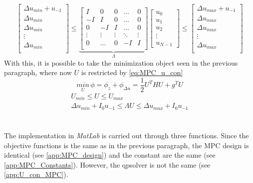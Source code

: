 \begin{equation}
    \begin{bmatrix}
        \Delta u_{min}+u_{-1}\\
        \Delta u_{min}\\
        \Delta u_{min}\\
        \vdots\\
        \Delta u_{min}\\
    \end{bmatrix} \leq
    \underbrace{
    \begin{bmatrix}
        I & 0 & 0 & \dots & 0\\
        -I & I & 0 & \dots & 0\\
        0 & -I & I & \dots & 0\\
        \vdots & \vdots & \vdots & \ddots & \vdots \\
        0 & \dots & 0 & -I & I\\
    \end{bmatrix}}_\Lambda
    \begin{bmatrix}
        u_0\\ u_1\\ u_2\\ \vdots\\ u_{N-1}
    \end{bmatrix}\leq
    \begin{bmatrix}
        \Delta u_{max}+u_{-1}\\
        \Delta u_{max}\\
        \Delta u_{max}\\
        \vdots\\
        \Delta u_{max}\\
    \end{bmatrix}
    \label{eq:In_con_Delta_u}
\end{equation}
With this, it is possible to take the minimization object seen in the previous paragraph, where now $U$ is restricted by \cref{eq:MPC_u_con}
\begin{equation}
    \underset{U}{min}\,\phi=\phi_z+\phi_{\Delta u}=\frac{1}{2}U^THU+g^TU
\end{equation}
\begin{equation}
    \label{eq:MPC_u_con}
    \begin{gathered}
        U_{min}\leq U\leq U_{max}\\
        \Delta u_{min}+I_0u_{-1} \leq \Lambda U\leq \Delta u_{max}+I_0u_{-1}
    \end{gathered}
\end{equation}
\\\\
The implementation in \textit{MatLab} is carried out through three functions. Since the objective functions is the same as in the previous paragraph, the MPC design is identical (see \cref{app:MPC_design}) and the constant are the same (see \cref{app:MPC_Constants}). However, the qpsolver is not the same (see \cref{app:U_con_MPC}).